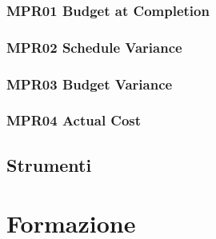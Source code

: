 \subsubsection{MPR01 Budget at Completion}\label{4.2.5.1}

\subsubsection{MPR02 Schedule Variance}\label{4.2.5.2}

\subsubsection{MPR03 Budget Variance}\label{4.2.5.3}

\subsubsection{MPR04 Actual Cost}\label{4.2.5.4}

\subsection{Strumenti}\label{4.2.6}

\section{Formazione}\label{4.3}